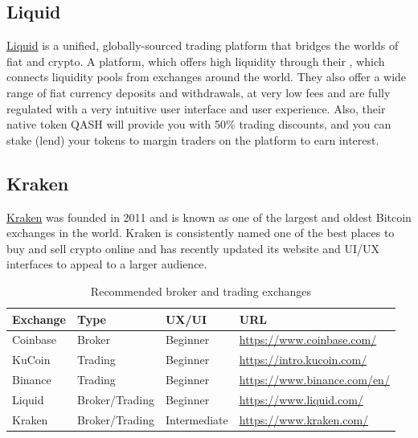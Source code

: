 \subsection*{Liquid}
\href{https://www.liquid.com?affiliate=nUfQhVL4164547}{Liquid} is a unified, globally-sourced trading platform that bridges the worlds of fiat and crypto. A platform, which offers high liquidity through their , which connects liquidity pools from exchanges around the world. They also offer a wide range of fiat currency deposits and withdrawals, at very low fees and are fully regulated with a very intuitive user interface and user experience. Also, their native token QASH will provide you with 50\% trading discounts, and you can stake (lend) your tokens to margin traders on the platform to earn interest.

\subsection*{Kraken}
\href{https://www.kraken.com/}{Kraken} was founded in 2011 and is known as one of the largest and oldest Bitcoin exchanges in the world. Kraken is consistently named one of the best places to buy and sell crypto online and has recently updated its website and UI/UX interfaces to appeal to a larger audience. 

\begin{table}[b]

\centering

\caption{Recommended broker and trading exchanges}
\begin{tabular}{llll} 
\toprule

\textbf{Exchange} & \textbf{Type } & \textbf{UX/UI} & \textbf{URL}\\
\midrule

Coinbase & Broker & Beginner & \href{https://www.coinbase.com/join/51954a2b26a1bcc484000015}{https://www.coinbase.com/} \\
KuCoin   &  Trading & Beginner & \href{https://www.kucoin.com/#/?r=aNuPeb}{https://intro.kucoin.com/} \\
Binance  &  Trading & Beginner & \href{https://www.binance.com/?ref=35602166}{https://www.binance.com/en/} \\
Liquid   &  Broker/Trading & Beginner & \href{https://www.liquid.com?affiliate=nUfQhVL4164547}{https://www.liquid.com/} \\
Kraken   &  Broker/Trading & Intermediate & \href{https://www.kraken.com/}{https://www.kraken.com/} \\


\bottomrule
\end{tabular}
\label{tab:exchange selection}
\end{table}

